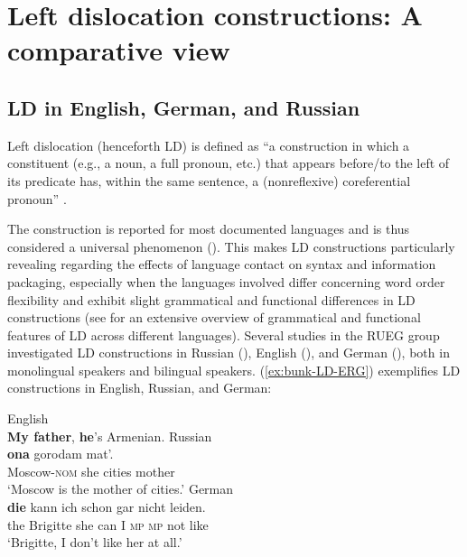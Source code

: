 \documentclass[output=paper,colorlinks,citecolor=brown]{langscibook}
\begin{document}
\section{Left dislocation constructions: A comparative view} \label{sec:bunk-left-dislocation}
\subsection{LD in English, German, and Russian }

Left dislocation (henceforth LD) is defined as “a construction in which a constituent (e.g., a noun, a full pronoun, etc.) that appears before/to the left of its predicate has, within the same sentence, a (nonreflexive) coreferential pronoun” \citep[378]{duranti_left-dislocation_1979}.

The construction is reported for most documented languages and is thus considered a universal phenomenon (\cite{lambrecht_dislocation_2001, westbury_left_2016}). This makes LD constructions particularly revealing regarding the effects of language contact on syntax and information packaging, especially when the languages involved differ concerning word order flexibility and exhibit slight grammatical and functional differences in LD constructions (see \citealp{westbury_left_2016} for an extensive overview of grammatical and functional features of LD across different languages). Several studies in the RUEG group investigated LD constructions in Russian (\citealp{zerbian_leftdislocations}), English (\citealp{pashkova_left_nodate}), and German (\citealt{conti_german_2022, sluckin_noncanonical_2023}), both in monolingual speakers and bilingual speakers. (\ref{ex:bunk-LD-ERG}) exemplifies LD constructions in English, Russian, and German: 

\begin{exe}
\ex \label{ex:bunk-LD-ERG}
    \begin{xlist}
    \ex English \\ 			
    {\textbf{My father}, \textbf{he}’s Armenian.} \citep[2]{prince_functions_1997}
    \ex  Russian \\
     {\textbf{ona}} {gorodam} {mat’.} \\
    Moscow-\textsc{nom} she cities mother \\
    \glt ‘Moscow is the mother of cities.’ \citep[103]{king_configuring_1995} 
    \ex German \\
 {\textbf{die}} {kann} {ich} {schon} {gar} {nicht} {leiden.} \\
{the {} Brigitte} she can I \textsc{mp} \textsc{mp} not like \\
\glt ‘Brigitte, I don’t like her at all.’ \citep[48]{altmann_formen_1981}
    \end{xlist}
\end{exe}
\end{document}
